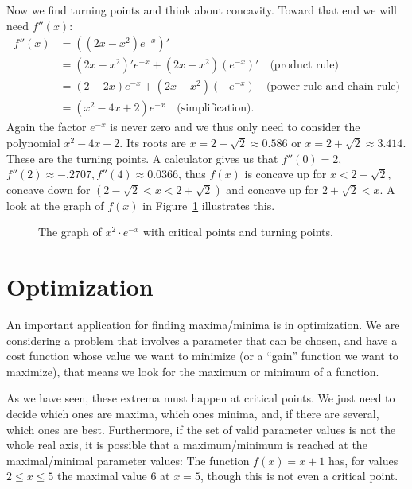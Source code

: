 \begin{bsp}
Now we find turning points and think about concavity. Toward that end we will
need $f''(x)$: \begin{equation*} \begin{split} f''(x) &= ((2x-x^2)e^{-x})' \\
&= (2x-x^2)'e^{-x} + (2x-x^2)(e^{-x})' \quad \text{(product rule)} \\ &=
(2-2x)e^{-x} + (2x-x^2)(-e^{-x}) \quad \text{(power rule and chain rule)}\\
&= (x^2-4x+2)e^{-x} \quad \text{(simplification)}.  \end{split}
\end{equation*}
Again the factor $e^{-x}$ is never zero and we thus only need to consider
the polynomial $x^2-4x+2$. Its roots are
$x=2-\sqrt{2} \approx 0.586$ or $x=2+\sqrt{2} \approx 3.414$. These
are the turning points. A calculator gives us  that
$f''(0) = 2$, $f''(2) \approx -.2707, f''(4) \approx 0.0366$, thus
$f(x)$ is concave up for $x<2-\sqrt{2}$, concave down for
$(2-\sqrt{2}<x<2+\sqrt{2})$ and concave up for $2+\sqrt{2}<x$.
A look at the graph of $f(x)$ in Figure~\ref{tnex3fig} illustrates this.
\begin{figure}
\begin{center}
\end{center}
\caption{The graph of $x^2\cdot e^{-x}$ with critical points and turning
points.}
\label{tnex3fig}
\end{figure}
\end{bsp}


\section{Optimization}

An important application for finding maxima/minima is in optimization. We
are considering a problem that involves a parameter that can be chosen, and
have a cost function whose value we want to minimize (or a ``gain'' function
we want to maximize), that means we look for the maximum or minimum of a
function.
\smallskip

As we have seen, these extrema must happen at critical points. We just need
to decide which ones are maxima, which ones minima, and, if there are
several, which ones are best. Furthermore, if the set of valid parameter
values is not the whole real axis, it is possible that a maximum/minimum is
reached at the maximal/minimal parameter values: The function $f(x)=x+1$ has,
for values $2\le x\le 5$ the maximal value $6$ at $x=5$, though this is not
even a critical point.
\medskip

